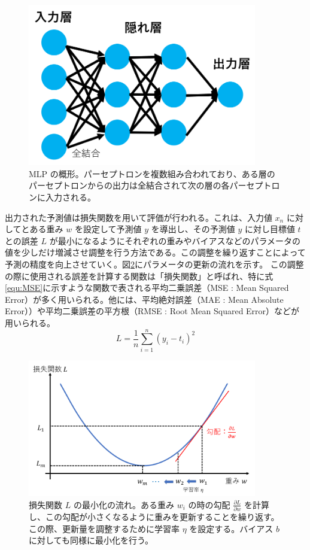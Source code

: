 \begin{figure}[tb]
  \centering
  \includegraphics[clip, width=10cm]{fig/4/MLP_re.png}
  \caption{MLP の概形。パーセプトロンを複数組み合われており、ある層のパーセプトロンからの出力は全結合されて次の層の各パーセプトロンに入力される。}
  \label{fig:MLP}
\end{figure}

出力された予測値は損失関数を用いて評価が行われる。これは、入力値 $x_n$ に対してとある重み $w$ を設定して予測値 $y$ を導出し、その予測値 $y$ に対し目標値 $t$ との誤差 $L$ が最小になるようにそれぞれの重みやバイアスなどのパラメータの値を少しだけ増減させ調整を行う方法である。この調整を繰り返すことによって予測の精度を向上させていく。図\ref{fig:lossfunction}にパラメータの更新の流れを示す。
この調整の際に使用される誤差を計算する関数は「損失関数」と呼ばれ、特に式\ref{equ:MSE}に示すような関数で表される平均二乗誤差（MSE : Mean Squared Error）が多く用いられる。他には、平均絶対誤差（MAE : Mean Absolute Error））や平均二乗誤差の平方根（RMSE : Root Mean Squared Error）などが用いられる。
\begin{equation}
    L = \frac{1}{n}\sum^{n}_{i=1}(y_i-t_i)^2
    \label{equ:MSE}
\end{equation}

\begin{figure}[tb]
  \centering
  \includegraphics[clip, width=10cm]{fig/4/lossfunc_laerning.png}
  \caption{損失関数 $L$ の最小化の流れ。ある重み $w_i$ の時の勾配 $\frac{\partial L}{\partial w}$ を計算し、この勾配が小さくなるように重みを更新することを繰り返す。この際、更新量を調整するために学習率 $\eta$ を設定する。バイアス $b$ に対しても同様に最小化を行う。}
  \label{fig:lossfunction}
\end{figure}

